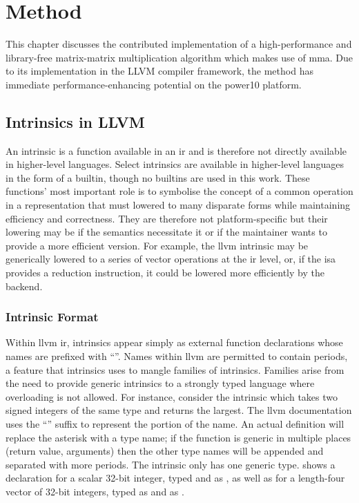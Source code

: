 \documentclass[\main/thesis.tex]{subfiles}
\begin{document}
\chapter{Method}
\label{cha:method}
This chapter discusses the contributed implementation of a high-performance and library-free matrix-matrix multiplication algorithm which makes use of \gls{mma}.
Due to its implementation in the LLVM compiler framework, the method has immediate performance-enhancing potential on the \gls{power10} platform.

\section{Intrinsics in LLVM}
An \gls{intrinsic} is a function available in an \gls{ir} and is therefore not directly available in higher-level languages.
Select \glspl{intrinsic} are available in higher-level languages in the form of a \gls{builtin}, though no \glspl{builtin} are used in this work.\footnotemark
{}
These functions' most important role is to symbolise the concept of a common operation in a representation that must lowered to many disparate forms while maintaining efficiency and correctness.
They are therefore not platform-specific but their lowering may be if the semantics necessitate it or if the maintainer wants to provide a more efficient version.
For example, the \gls{llvm} \gls{intrinsic}  may be generically lowered to a series of vector operations at the \gls{ir} level, or, if the \gls{isa} provides a reduction instruction, it could be lowered more efficiently by the backend.

\subsection{Intrinsic Format}
Within \gls{llvm} \gls{ir}, \glspl{intrinsic} appear simply as external function declarations whose names are prefixed with ``''.
Names within \gls{llvm} are permitted to contain periods, a feature that \glspl{intrinsic} uses to \gls{mangle} families of \glspl{intrinsic}.
Families arise from the need to provide generic \glspl{intrinsic} to a strongly typed language where overloading is not allowed.
For instance, consider the  \gls{intrinsic} which takes two signed integers of the same type and returns the largest.
The \gls{llvm} documentation uses the ``'' suffix to represent the  portion of the name.
An actual definition will replace the asterisk with a type name; if the function is generic in multiple places (return value, arguments) then the other type names will be appended and separated with more periods.
The  \gls{intrinsic} only has one generic type.
 shows a declaration for a scalar 32-bit integer, typed and  as , as well as for a length-four vector of 32-bit integers, typed as  and  as .
\end{document}
